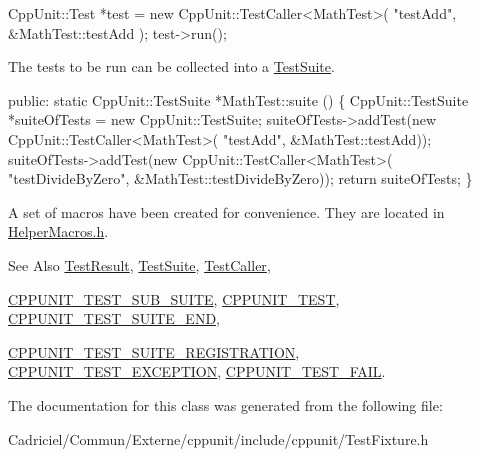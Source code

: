 \begin{DoxyCode}
CppUnit::Test *test = \textcolor{keyword}{new} CppUnit::TestCaller<MathTest>( \textcolor{stringliteral}{"testAdd"}, 
                                                         &MathTest::testAdd );
test->run();
\end{DoxyCode}


The tests to be run can be collected into a \hyperlink{class_test_suite}{Test\-Suite}.


\begin{DoxyCode}
\textcolor{keyword}{public}: 
  \textcolor{keyword}{static} CppUnit::TestSuite *MathTest::suite () \{
     CppUnit::TestSuite *suiteOfTests = \textcolor{keyword}{new} CppUnit::TestSuite;
     suiteOfTests->addTest(\textcolor{keyword}{new} CppUnit::TestCaller<MathTest>(
                             \textcolor{stringliteral}{"testAdd"}, &MathTest::testAdd));
     suiteOfTests->addTest(\textcolor{keyword}{new} CppUnit::TestCaller<MathTest>(
                             \textcolor{stringliteral}{"testDivideByZero"}, &MathTest::testDivideByZero));
     \textcolor{keywordflow}{return} suiteOfTests;
 \}
\end{DoxyCode}


A set of macros have been created for convenience. They are located in \hyperlink{_helper_macros_8h}{Helper\-Macros.\-h}.

\begin{DoxySeeAlso}{See Also}
\hyperlink{class_test_result}{Test\-Result}, \hyperlink{class_test_suite}{Test\-Suite}, \hyperlink{class_test_caller}{Test\-Caller}, 

\hyperlink{group___writing_test_fixture_gae19f30ade82172cf6c3ff297367a10c2}{C\-P\-P\-U\-N\-I\-T\-\_\-\-T\-E\-S\-T\-\_\-\-S\-U\-B\-\_\-\-S\-U\-I\-T\-E}, \hyperlink{group___writing_test_fixture_gaac9b03d898b207e1daf2f93867935a96}{C\-P\-P\-U\-N\-I\-T\-\_\-\-T\-E\-S\-T}, \hyperlink{group___writing_test_fixture_ga601b2e1d525f3947b216e28c625abcb1}{C\-P\-P\-U\-N\-I\-T\-\_\-\-T\-E\-S\-T\-\_\-\-S\-U\-I\-T\-E\-\_\-\-E\-N\-D}, 

\hyperlink{_helper_macros_8h_a2f4071eec88d1e306665ada0f2dd80e4}{C\-P\-P\-U\-N\-I\-T\-\_\-\-T\-E\-S\-T\-\_\-\-S\-U\-I\-T\-E\-\_\-\-R\-E\-G\-I\-S\-T\-R\-A\-T\-I\-O\-N}, \hyperlink{group___writing_test_fixture_gaca8eeb6f60714baade6cbfd185868c40}{C\-P\-P\-U\-N\-I\-T\-\_\-\-T\-E\-S\-T\-\_\-\-E\-X\-C\-E\-P\-T\-I\-O\-N}, \hyperlink{group___writing_test_fixture_ga5bdaf0444216a8f93ead13d5ae964d7e}{C\-P\-P\-U\-N\-I\-T\-\_\-\-T\-E\-S\-T\-\_\-\-F\-A\-I\-L}. 
\end{DoxySeeAlso}


The documentation for this class was generated from the following file\-:\begin{DoxyCompactItemize}
\item 
Cadriciel/\-Commun/\-Externe/cppunit/include/cppunit/Test\-Fixture.\-h\end{DoxyCompactItemize}

